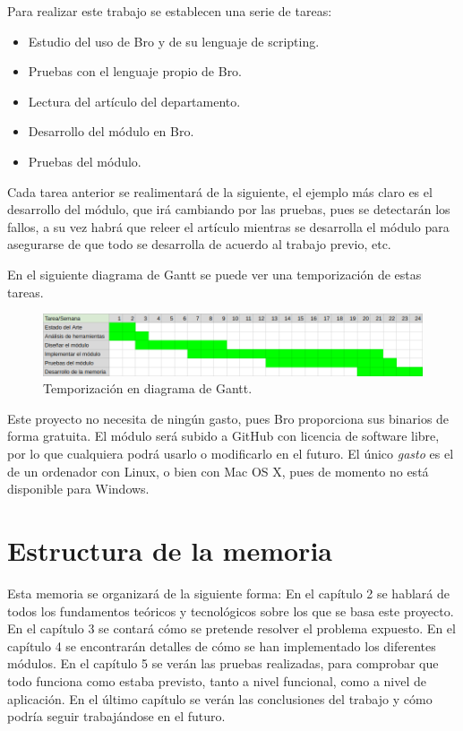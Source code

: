 Para realizar este trabajo se establecen una serie de tareas:

\begin{itemize}
\item Estudio del uso de Bro y de su lenguaje de scripting.
\item Pruebas con el lenguaje propio de Bro.
\item Lectura del artículo del departamento. \cite{comparacion}
\item Desarrollo del módulo en Bro.
\item Pruebas del módulo.
\end{itemize}

Cada tarea anterior se realimentará de la siguiente, el ejemplo más claro es el desarrollo del módulo, que 
irá cambiando por las pruebas, pues se detectarán los fallos, a su vez habrá que releer el artículo mientras 
se desarrolla el módulo para asegurarse de que todo se desarrolla de acuerdo al trabajo previo, etc.

\intro En el siguiente diagrama de Gantt se puede ver una temporización de estas tareas. 

\begin{figure}[H]
  \includegraphics[width=1\textwidth]{imagenes/temporizacion.png} 
  \centering
  \caption{Temporización en diagrama de Gantt.}
\end{figure}

Este proyecto no necesita de ningún gasto, pues Bro \cite{broindex} proporciona sus binarios de 
forma gratuita. El módulo será subido a GitHub \cite{repo} con licencia de software libre, por lo que cualquiera 
podrá usarlo o modificarlo en el futuro. El único \textit{gasto} es el de un ordenador con Linux, 
o bien con Mac OS X, pues de momento no está disponible para Windows. \cite{brodownload}


\section{Estructura de la memoria}

Esta memoria se organizará de la siguiente forma: En el capítulo 2 se hablará de 
todos los fundamentos teóricos y tecnológicos sobre los que se basa este proyecto. 
En el capítulo 3 se contará cómo se pretende resolver el problema expuesto. En el 
capítulo 4 se encontrarán detalles de cómo se han implementado los diferentes módulos. 
En el capítulo 5 se verán las pruebas realizadas, para comprobar que todo funciona como 
estaba previsto, tanto a nivel funcional, como a nivel de aplicación. En el último capítulo 
se verán las conclusiones del trabajo y cómo podría seguir trabajándose en el futuro.

